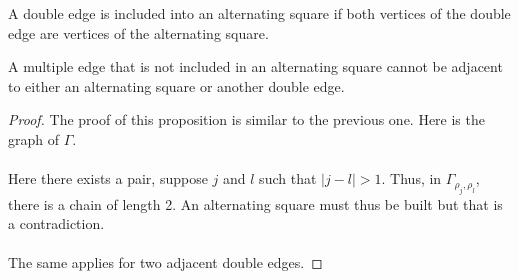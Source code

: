 \begin{definition}
  A double edge is included into an alternating square if both vertices of the double edge are vertices of the alternating square.
\end{definition}

\begin{proposition}
  A multiple edge that is not included in an alternating square cannot be adjacent to either an alternating square or another double edge.
\end{proposition}

\begin{proof}
  The proof of this proposition is similar to the previous one. Here is the graph of $\Gamma$.

  \begin{figure}[H]
    \begin{center}
      \caption{}
    \end{center}
  \end{figure}

  \paragraph{}
  Here there exists a pair, suppose $j$ and $l$ such that $|j-l| > 1$. Thus, in $\Gamma_{\rho_j, \rho_l}$, there is a chain of length 2. An alternating square must thus be built but that is a contradiction.

  \paragraph{}
  The same applies for two adjacent double edges.

\end{proof}


